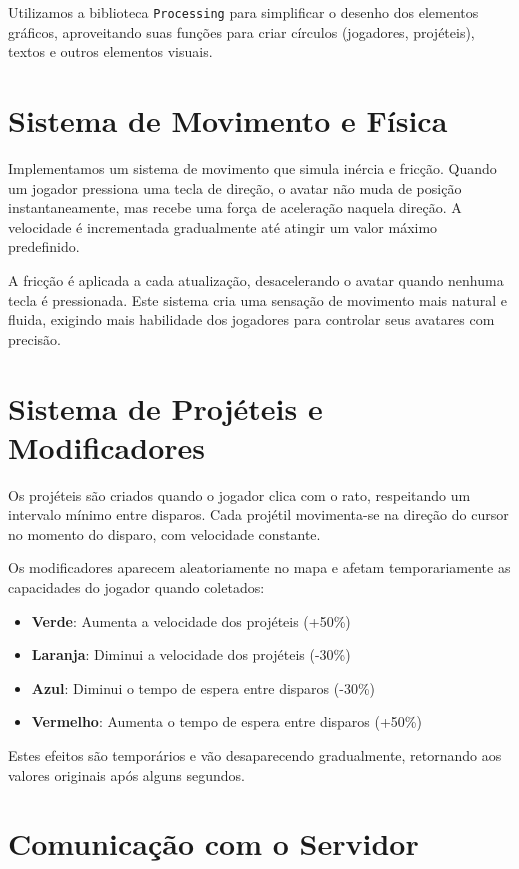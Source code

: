 \documentclass[12pt,a4paper]{report}
\begin{document}
Utilizamos a biblioteca \texttt{Processing} para simplificar o desenho dos elementos gráficos, aproveitando suas funções para criar círculos (jogadores, projéteis), textos e outros elementos visuais.

\section{Sistema de Movimento e Física}

Implementamos um sistema de movimento que simula inércia e fricção. Quando um jogador pressiona uma tecla de direção, o avatar não muda de posição instantaneamente, mas recebe uma força de aceleração naquela direção. A velocidade é incrementada gradualmente até atingir um valor máximo predefinido.

A fricção é aplicada a cada atualização, desacelerando o avatar quando nenhuma tecla é pressionada. Este sistema cria uma sensação de movimento mais natural e fluida, exigindo mais habilidade dos jogadores para controlar seus avatares com precisão.

\section{Sistema de Projéteis e Modificadores}

Os projéteis são criados quando o jogador clica com o rato, respeitando um intervalo mínimo entre disparos. Cada projétil movimenta-se na direção do cursor no momento do disparo, com velocidade constante.

Os modificadores aparecem aleatoriamente no mapa e afetam temporariamente as capacidades do jogador quando coletados:

\begin{itemize}
    \item \textbf{Verde}: Aumenta a velocidade dos projéteis (+50\%)
    \item \textbf{Laranja}: Diminui a velocidade dos projéteis (-30\%)
    \item \textbf{Azul}: Diminui o tempo de espera entre disparos (-30\%)
    \item \textbf{Vermelho}: Aumenta o tempo de espera entre disparos (+50\%)
\end{itemize}

Estes efeitos são temporários e vão desaparecendo gradualmente, retornando aos valores originais após alguns segundos.

\section{Comunicação com o Servidor}
\end{document}
